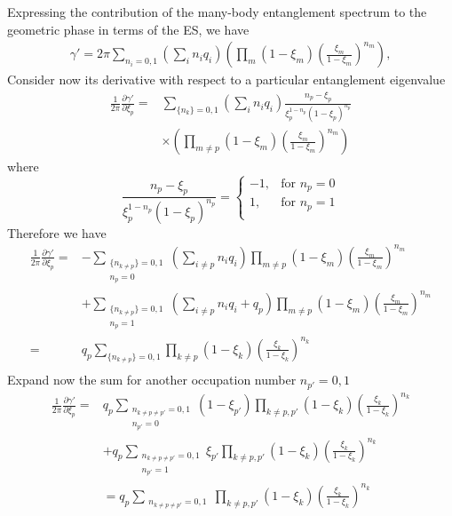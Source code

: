 \documentclass[prb,twocolumn,amsmath,longbibliography,amssymb,superscriptaddress]{revtex4-1}
\begin{document}
Expressing the contribution of the many-body entanglement spectrum to the geometric phase in terms of the ES, we have
\begin{align*}
\gamma' = 2\pi \sum_{n_i = 0,1} \left(\sum_{i } n_i q_i\right) \left(\prod_m (1- \xi_m)\left(\frac{\xi_m}{1-\xi_m} \right)^{n_m} \right) ,
\end{align*} 
Consider now its derivative with respect to a particular entanglement eigenvalue
\begin{align}
\frac{1}{2\pi}\frac{\partial \gamma'}{\partial \xi_p} =& \sum_{\{n_k\}=0,1}\left(\sum_{i } n_i q_i\right)\frac{n_p - \xi_p}{\xi_p^{1-n_p}(1-\xi_p)^{n_p}}\\
&\times \left(\prod_{m\neq p} (1- \xi_m)\left(\frac{\xi_m}{1-\xi_m} \right)^{n_m} \right)
\end{align}
where
\begin{equation}
 \frac{n_p - \xi_p}{\xi_p^{1-n_p}(1-\xi_p)^{n_p}} = 
  \begin{cases}
    -1, & \text{for } n_p=0 \\
    1, & \text{for } n_p = 1 \\
  \end{cases}	
\end{equation}
Therefore we have
\begin{align*}
\frac{1}{2\pi}\frac{\partial \gamma'}{\partial \xi_p} =& -\sum_{\substack{\{n_{k\neq p}\}=0,1 \\ n_p = 0}}\left(\sum_{i \neq p} n_i q_i\right)\prod_{m\neq p} (1-\xi_m)\left( \frac{\xi_m}{1-\xi_m} \right)^{n_m} \\
&+ \sum_{\substack{\{n_{k\neq p}\}=0,1 \\ n_p = 1}}\left(\sum_{i \neq p} n_i q_i +q_p\right) \prod_{m\neq p} (1-\xi_m)\left( \frac{\xi_m}{1-\xi_m} \right)^{n_m} \\
=&q_p\sum_{\{n_{k\neq p}\}=0,1} \prod_{k\neq p} (1-\xi_k)\left( \frac{\xi_k}{1-\xi_k} \right)^{n_k} \\
\end{align*}
Expand now the sum  for another occupation number $n_{p'} = 0,1$ 
\begin{align*}
\frac{1}{2\pi}\frac{\partial \gamma'}{\partial \xi_p} =& q_p\sum_{\substack{n_{k \neq p \neq p'}=0,1\\ n_{p'}= 0}} (1-\xi_{p'})\prod_{k\neq p,p'} (1-\xi_k)\left( \frac{\xi_k}{1-\xi_k} \right)^{n_k} \\
&+ q_p\sum_{\substack{n_{k \neq p \neq p'}=0,1\\ n_{p'}= 1}} \xi_{p'}\prod_{k\neq p,p'} (1-\xi_k)\left( \frac{\xi_k}{1-\xi_k} \right)^{n_k} \\
 &=q_p\sum_{\substack{n_{k \neq p \neq p'}=0,1}} \prod_{k\neq p,p'} (1-\xi_k)\left( \frac{\xi_k}{1-\xi_k} \right)^{n_k} 
\end{align*}
\end{document}
